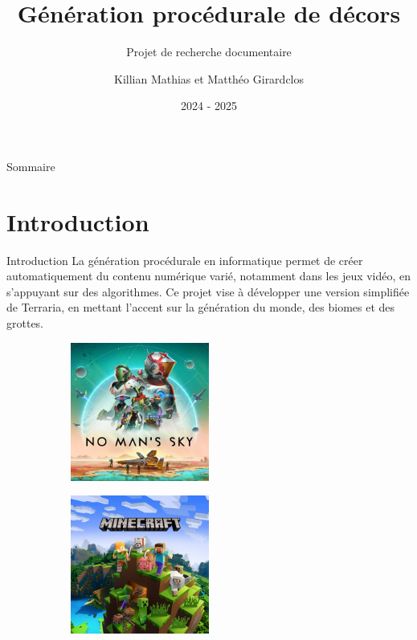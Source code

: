 \documentclass[aspectratio=169]{beamer}
\title[Génération procédurale]{Génération procédurale de décors}
\subtitle{Projet de recherche documentaire}
\author[K.Mathias, M.Girardclos]{Killian Mathias et Matthéo Girardclos}
\institute[UMLP]{Université Marie et Louis Pasteur}
\date{2024 - 2025}
\begin{document}
\begin{frame}
    \titlepage
\end{frame}

\begin{frame}[t]{Sommaire}
    \tableofcontents[hideallsubsections]
\end{frame}


\section{Introduction}

\begin{frame}{Introduction}
    La génération procédurale en informatique permet de créer automatiquement du contenu numérique varié, notamment dans les jeux vidéo, en s’appuyant sur des algorithmes. Ce projet vise à développer une version simplifiée de Terraria, en mettant l’accent sur la génération du monde, des biomes et des grottes.
    \vfill
    \begin{figure}[!h]
        \centering
        \begin{subfigure}[b]{0.3\textwidth}
            \centering
            \includegraphics[width=0.5\textwidth]{assets/nomanssky.png}
        \end{subfigure}
        \hspace{-1cm}
        \begin{subfigure}[b]{0.3\textwidth}
            \centering
            \includegraphics[width=0.5\textwidth]{assets/minecraft.png}
        \end{subfigure}
    \end{figure}
\end{frame}
\end{document}
